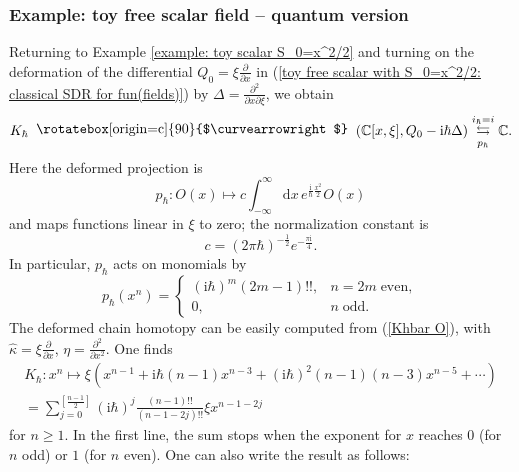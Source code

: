 \documentclass{amsart}
\theoremstyle{plain} %
\theoremstyle{definition}
\newtheorem{expl}[thm]{Example}
\theoremstyle{remark}
\newcommand{\mr}{\mathrm}
\newcommand{\wh}{\widehat}
\newcommand{\CC}{\mathbb{C}}
\newcommand{\dd}{\partial}
\newcommand{\iii}{\mathrm{i}}
\newcommand{\SDR}[5]{#5\;\;\raisebox{1.3pt}{\rotatebox[origin=c]{90}{$\curvearrowright$}}\;\; #1 \underset{#4}{\stackrel{#3}{\leftrightarrows}} #2}  %
\newcommand{\dr}{\mathrm{d}}
\begin{document}
\subsubsection{Example: toy free scalar field -- quantum version}
\label{sss: example -- quantum toy free scalar}
    Returning to Example \ref{example: toy scalar S_0=x^2/2} and turning on the deformation of the differential $Q_0=\xi\frac{\dd}{\dd x}$ in (\ref{toy free scalar with S_0=x^2/2: classical SDR for fun(fields)}) by $\Delta=\frac{\dd^2}{\dd x\dd\xi}$, we obtain
    \begin{equation}
        \SDR{(\CC[x,\xi],Q_0-\iii\hbar\Delta)}{\CC}{i_\hbar=i}{p_\hbar}{K_\hbar}.
    \end{equation}
    Here the deformed projection is
    \begin{equation}
        p_\hbar\colon O(x)\mapsto c\int_{-\infty}^\infty \dr x\, e^{\frac{\iii}{\hbar}\frac{x^2}{2}} O(x)
    \end{equation}
    and maps functions linear in $\xi$ to zero; the normalization constant is 
    \begin{equation}\label{c toy scalar}
    c=(2\pi\hbar)^{-\frac12}e^{-\frac{\pi \iii}{4}}.
    \end{equation}
    In particular, $p_\hbar$ acts on monomials by
    \begin{equation}
        p_\hbar(x^n)=
        \left\{\begin{array}{cl}
        (\iii\hbar)^m(2m-1)!!,& n=2m\;\mr{even},\\
        0,& n\; \mr{odd}.
        \end{array}\right.
    \end{equation}
    The deformed chain homotopy can be easily computed from (\ref{Khbar O}), with $\wh\kappa=\xi\frac{\dd}{\dd x}$, $\eta= \frac{\dd^2}{\dd x^2}$. One finds
    \begin{multline}\label{Khbar toy scalar 1}
        K_\hbar\colon x^n \mapsto \xi (x^{n-1}+\iii\hbar (n-1)x^{n-3}+(\iii\hbar)^2 (n-1)(n-3)x^{n-5}+\cdots)
        \\=
        \sum_{j=0}^{\left[ \frac{n-1}{2}\right]}
        (\iii\hbar)^j %
        \frac{(n-1)!!}{(n-1-2j)!!} \xi x^{n-1-2j}
    \end{multline}
    for $n\geq 1$.
    In the first line, the sum stops when the exponent for $x$ reaches $0$ (for $n$ odd) or $1$ (for $n$ even). One can also write the result as follows:
\end{document}
